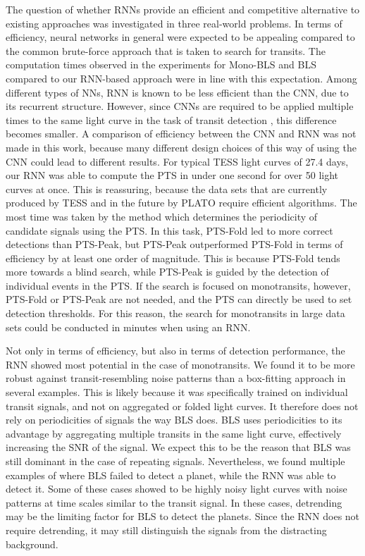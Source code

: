 The question of whether RNNs provide an efficient and competitive alternative to existing approaches was investigated in three real-world problems. In terms of efficiency, neural networks in general were expected to be appealing compared to the common brute-force approach that is taken to search for transits. The computation times observed in the experiments for Mono-BLS and BLS compared to our RNN-based approach were in line with this expectation. Among different types of NNs, RNN is known to be less efficient than the CNN, due to its recurrent structure. However, since CNNs are required to be applied multiple times to the same light curve in the task of transit detection \cite{pearson2018searching}, this difference becomes smaller. A comparison of efficiency between the CNN and RNN was not made in this work, because many different design choices of this way of using the CNN could lead to different results. For typical TESS light curves of 27.4 days, our RNN was able to compute the PTS in under one second for over 50 light curves at once. This is reassuring, because the data sets that are currently produced by TESS and in the future by PLATO require efficient algorithms. The most time was taken by the method which determines the periodicity of candidate signals using the PTS. In this task, PTS-Fold led to more correct detections than PTS-Peak, but PTS-Peak outperformed PTS-Fold in terms of efficiency by at least one order of magnitude. This is because PTS-Fold tends more towards a blind search, while PTS-Peak is guided by the detection of individual events in the PTS. If the search is focused on monotransits, however, PTS-Fold or PTS-Peak are not needed, and the PTS can directly be used to set detection thresholds. For this reason, the search for monotransits in large data sets could be conducted in minutes when using an RNN.

Not only in terms of efficiency, but also in terms of detection performance, the RNN showed most potential in the case of monotransits. We found it to be more robust against transit-resembling noise patterns than a box-fitting approach in several examples. This is likely because it was specifically trained on individual transit signals, and not on aggregated or folded light curves. It therefore does not rely on periodicities of signals the way BLS does. BLS uses periodicities to its advantage by aggregating multiple transits in the same light curve, effectively increasing the SNR of the signal. We expect this to be the reason that BLS was still dominant in the case of repeating signals. Nevertheless, we found multiple examples of where BLS failed to detect a planet, while the RNN was able to detect it. Some of these cases showed to be highly noisy light curves with noise patterns at time scales similar to the transit signal. In these cases, detrending may be the limiting factor for BLS to detect the planets. Since the RNN does not require detrending, it may still distinguish the signals from the distracting background.

